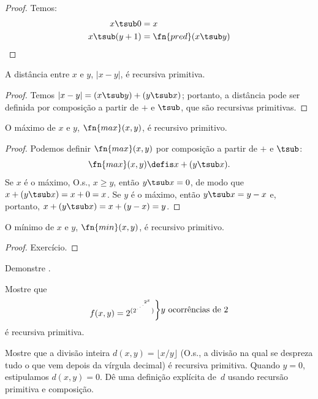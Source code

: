 \documentclass[../../../include/open-logic-section]{subfiles}
\begin{document}
\begin{proof}
  Temos:
  \begin{align*}
    x \tsub 0 & = x\\
    x \tsub (y+1) & = \fn{pred}(x \tsub y) 
  \end{align*}
\end{proof}

\begin{prop}
 A distância entre $x$ e $y$, $\left|x-y\right|$, é recursiva primitiva.
\end{prop}

\begin{proof}
  Temos $\left| x-y \right| = (x \tsub y) + (y \tsub x)$; portanto, a
  distância pode ser definida por composição a partir de $+$ e $\tsub$, que
  são recursivas primitivas.
\end{proof}

\begin{prop}
  O máximo de $x$ e $y$, $\fn{max}(x,y)$, é recursivo primitivo.
\end{prop}

\begin{proof}
  Podemos definir $\fn{max}(x,y)$ por composição a partir de $+$ e $\tsub$:
  \[
  \fn{max}(x,y) \defis x + (y \tsub x).
  \]
  Se $x$ é o máximo, O.s.\@, $x \ge y$, então $y \tsub x = 0$, de modo que
  $x + (y \tsub x) = x + 0 = x$. Se $y$ é o máximo, então
  $y \tsub x = y - x$ e, portanto,
  $x + (y \tsub x) = x + (y - x) = y$.
\end{proof}

\begin{prop}
  O mínimo de $x$ e $y$, $\fn{min}(x,y)$, é recursivo primitivo.
\end{prop}

\begin{proof}
  Exercício.
\end{proof}

\begin{prob}
  Demonstre .
\end{prob}

\begin{prob}
Mostre que \[
f(x, y) =
2^{(2^{\iddots^{2^{x}}})}\raisebox{1ex}{\bigg\rbrace}
\raisebox{1ex}{\text {$y$ ocorrências de $2$}}\] é recursiva primitiva.
\end{prob}

\begin{prob}
Mostre que a divisão inteira $d(x, y) = \lfloor x/y \rfloor$ (O.s.\@, a
divisão na qual se despreza tudo o que vem depois da vírgula decimal) é
recursiva primitiva. Quando $y = 0$, estipulamos $d(x, y) = 0$. Dê uma
definição explícita de~$d$ usando recursão primitiva e composição.
\end{prob}
\end{document}
